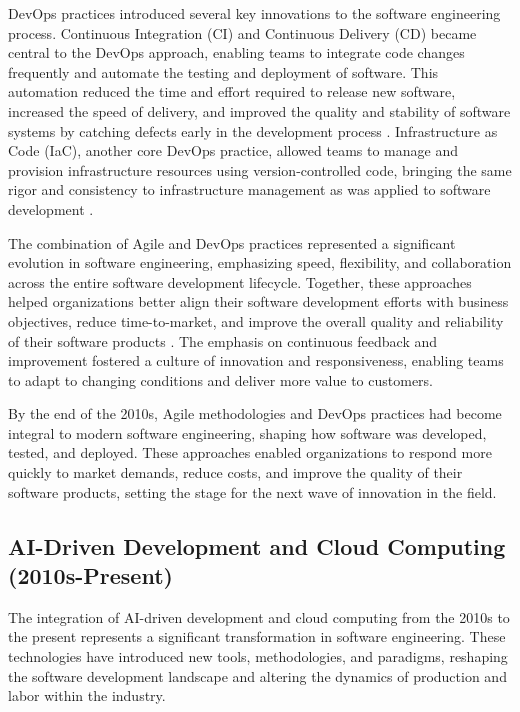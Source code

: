 \begin{refsection}
DevOps practices introduced several key innovations to the software engineering process. Continuous Integration (CI) and Continuous Delivery (CD) became central to the DevOps approach, enabling teams to integrate code changes frequently and automate the testing and deployment of software. This automation reduced the time and effort required to release new software, increased the speed of delivery, and improved the quality and stability of software systems by catching defects early in the development process \cite[pp.~123-126]{humble2019continuous}. Infrastructure as Code (IaC), another core DevOps practice, allowed teams to manage and provision infrastructure resources using version-controlled code, bringing the same rigor and consistency to infrastructure management as was applied to software development \cite[pp.~77-80]{morris2021infrastructure}.

The combination of Agile and DevOps practices represented a significant evolution in software engineering, emphasizing speed, flexibility, and collaboration across the entire software development lifecycle. Together, these approaches helped organizations better align their software development efforts with business objectives, reduce time-to-market, and improve the overall quality and reliability of their software products \cite[pp.~88-91]{rubin2014essential}. The emphasis on continuous feedback and improvement fostered a culture of innovation and responsiveness, enabling teams to adapt to changing conditions and deliver more value to customers.

By the end of the 2010s, Agile methodologies and DevOps practices had become integral to modern software engineering, shaping how software was developed, tested, and deployed. These approaches enabled organizations to respond more quickly to market demands, reduce costs, and improve the quality of their software products, setting the stage for the next wave of innovation in the field.

\subsection{AI-Driven Development and Cloud Computing (2010s-Present)}

The integration of AI-driven development and cloud computing from the 2010s to the present represents a significant transformation in software engineering. These technologies have introduced new tools, methodologies, and paradigms, reshaping the software development landscape and altering the dynamics of production and labor within the industry.


\end{refsection}
